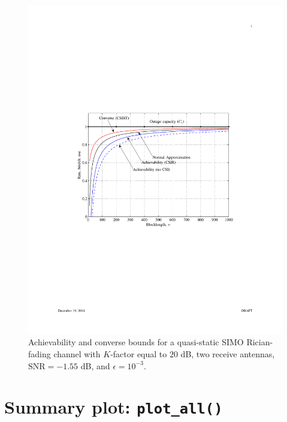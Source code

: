 \documentclass[a4paper,11p]{memoir}
\begin{document}
\begin{figure}[t]
	\centering
	\includegraphics[scale=0.8]{plots/quasi-static-simo.pdf}
\vspace{-1.5mm}
\caption{Achievability and converse bounds for a quasi-static SIMO Rician-fading channel with $K$-factor equal to $20$ dB, two receive antennas, $\text{SNR}=-1.55 $ dB, and $\epsilon=10^{-3}$. 
\label{fig:bounds-simo}}
\end{figure}


%
%
\section{Summary plot: \texttt{plot\_all()}}
\end{document}
